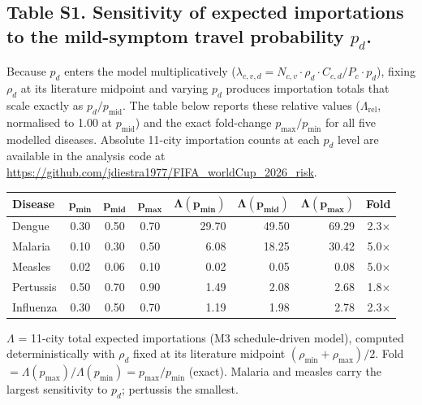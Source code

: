 \documentclass[12pt, a4paper]{article}
\begin{document}
\newpage

\subsection*{Table S1. Sensitivity of expected importations to the mild-symptom travel probability $p_d$.}

Because $p_d$ enters the model multiplicatively
($\lambda_{c,v,d} = N_{c,v}\cdot\rho_d\cdot C_{c,d}/P_c\cdot p_d$),
fixing $\rho_d$ at its literature midpoint and varying $p_d$ produces
importation totals that scale exactly as $p_d/p_{\text{mid}}$. The
table below reports these relative values ($\Lambda_{\text{rel}}$,
normalised to 1.00 at $p_{\text{mid}}$) and the exact fold-change
$p_{\max}/p_{\min}$ for all five modelled diseases. Absolute 11-city
importation counts at each $p_d$ level are available in the
analysis code at \url{https://github.com/jdiestra1977/FIFA\_worldCup\_2026\_risk}.

\medskip
\begin{center}
\small
\begin{tabular}{lcccrrrr}
\toprule
\textbf{Disease} &
  $\boldsymbol{p_{\min}}$ &
  $\boldsymbol{p_{\text{mid}}}$ &
  $\boldsymbol{p_{\max}}$ &
  $\boldsymbol{\Lambda(p_{\min})}$ &
  $\boldsymbol{\Lambda(p_{\text{mid}})}$ &
  $\boldsymbol{\Lambda(p_{\max})}$ &
  \textbf{Fold} \\
\midrule
Dengue    & 0.30 & 0.50 & 0.70 & 29.70 & 49.50 & 69.29 & 2.3$\times$ \\
Malaria   & 0.10 & 0.30 & 0.50 &  6.08 & 18.25 & 30.42 & 5.0$\times$ \\
Measles   & 0.02 & 0.06 & 0.10 &  0.02 &  0.05 &  0.08 & 5.0$\times$ \\
Pertussis & 0.50 & 0.70 & 0.90 &  1.49 &  2.08 &  2.68 & 1.8$\times$ \\
Influenza & 0.30 & 0.50 & 0.70 &  1.19 &  1.98 &  2.78 & 2.3$\times$ \\
\bottomrule
\end{tabular}
\end{center}

\medskip
\noindent
$\Lambda$ = 11-city total expected importations (M3 schedule-driven
model), computed deterministically with $\rho_d$ fixed at its
literature midpoint $({\rho_{\min}+\rho_{\max}})/2$.
Fold $= \Lambda(p_{\max})/\Lambda(p_{\min}) = p_{\max}/p_{\min}$ (exact).
Malaria and measles carry the largest sensitivity to $p_d$; pertussis
the smallest.
\end{document}
